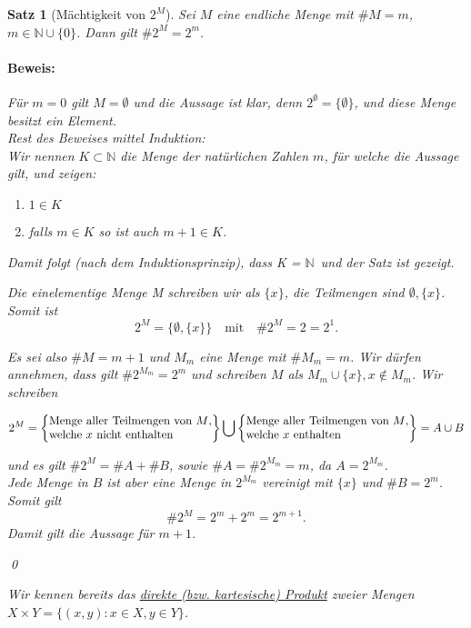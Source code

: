\documentclass{report}
\newcommand{\N}{\mathbb{N}}
\newcommand{\mN}{\(\mathbb{N}\)}
\theoremstyle{customrem}
\theoremstyle{customdef}
\newtheorem{satz}[definition]{Satz}
\renewenvironment{proof}{\paragraph{Beweis: }}{\qed}
\theoremstyle{customenv}
\begin{document}
	\begin{satz}[Mächtigkeit von $2^M$]
		Sei \(M\) eine endliche Menge mit \(\#M = m\), \(m \in \N \cup \{0\}\). Dann gilt \(\#2^M = 2^m\).

		\begin{proof}
			Für \(m = 0\) gilt \(M = \emptyset\) und die Aussage ist klar, denn \(2^\emptyset = \{\emptyset\}\), und diese Menge besitzt ein Element.\\
			Rest des Beweises mittel Induktion:\\
			Wir nennen \(K \subset \N\) die Menge der natürlichen Zahlen \(m\), für welche die Aussage gilt, und zeigen:
			\begin{enumerate}
				\itemsep0cm
				\item \(1 \in K\)
				\item falls \(m \in K\) so ist auch \(m + 1 \in K\).
			\end{enumerate}
			Damit folgt (nach dem Induktionsprinzip), dass  K = \mN\ und der Satz ist gezeigt.\\
			\begin{description}[labelindent = 12pt, labelwidth = 1.0cm, leftmargin = 1.0cm]
				\item[Zu 1.:] Die einelementige Menge M schreiben wir als \(\{x\}\), die Teilmengen sind \(\emptyset, \{x\}\). Somit ist \[2^M = \{\emptyset, \{x\}\}\quad\text{mit}\quad\#2^M = 2 = 2^1.\]
				\item[Zu 2.:] Es sei also \(\#M = m + 1\)  und \(M_m\) eine Menge mit \(\# M_m = m\). Wir dürfen annehmen, dass gilt \(\#2^{M_m} = 2^m\) und schreiben \(M\) als \(M_m \cup \{x\}, x \not\in M_m\). Wir schreiben

				\[2^M = \left\{\begin{matrix}\text{Menge aller Teilmengen von $M$,}\\\text{welche $x$ nicht enthalten}\hfill\end{matrix}\right\} \bigcup \left\{\begin{matrix}\text{Menge aller Teilmengen von $M$,}\\\text{welche $x$ enthalten}\hfill\end{matrix}\right\} = A \cup B\]

				und es gilt \(\#2^M = \#A + \#B\), sowie \(\#A = \#2^{M_m} = m\), da \(A = 2^{M_m}\).\\

				Jede Menge in \(B\) ist aber eine Menge in \(2^{M_m}\) vereinigt mit \(\{x\}\) und \(\#B = 2^m\). Somit gilt \[\#2^M = 2^m + 2^m = 2^{m + 1}.\]
				Damit gilt die Aussage für \(m + 1\).
			\end{description}
		\end{proof}

		Wir kennen bereits das \hyperref[defmengenoperationen]{direkte (bzw. kartesische) Produkt} zweier Mengen \(X \times Y = \{(x, y) : x\in X, y \in Y\}\).
	\end{satz}
\end{document}

